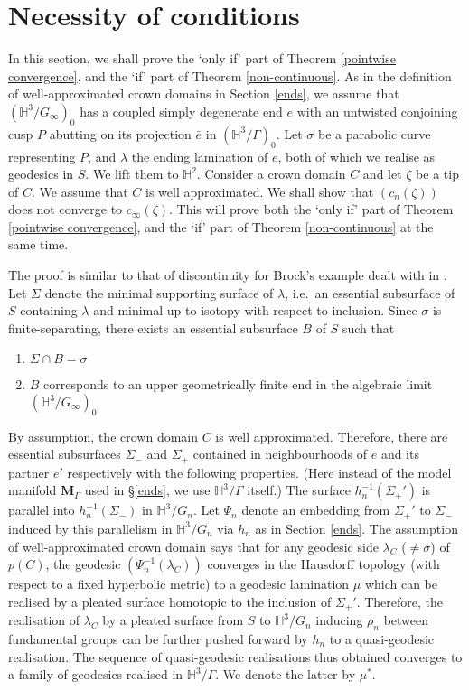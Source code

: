\documentclass{amsart}
\theoremstyle{definition}
\newcommand\HHH{{\mathbb H}}
\begin{document}
\section{Necessity of conditions}\label{necessity}
In this section, we shall prove  the \lq only if' part of Theorem \ref{pointwise convergence}, and  the \lq if' part of Theorem \ref{non-continuous}.
As in the  definition of well-approximated crown domains in Section \ref{ends}, we assume that $(\HHH^3/G_\infty)_0$ has  a coupled simply degenerate end $e$ with   an untwisted conjoining cusp $P$ abutting on its projection $\bar e$ in $(\HHH^3/\Gamma)_0$.
Let $\sigma$ be a parabolic curve representing $P$, and $\lambda$ the ending lamination of $e$, both of which we realise as geodesics in $S$.
We lift them to $\HHH^2$. Consider a crown domain $C$ and let $\zeta$ be a tip of $C$.
We assume that $C$ is well approximated.
We shall show that $(c_n(\zeta))$ does not converge to $c_\infty(\zeta)$. This will  prove  both the \lq only if' part of Theorem \ref{pointwise convergence}, and  the \lq if' part of Theorem \ref{non-continuous} at the same time.

The proof is similar to that of discontinuity for Brock's example   dealt with in \cite{mahan-series2}.
 Let $\Sigma$ denote the minimal supporting surface of $\lambda$, i.e.\ an essential subsurface of $S$ containing $\lambda$ and minimal up to isotopy with respect to  inclusion.
 Since $\sigma$ is finite-separating, there exists an essential subsurface $B$ of $S$ such that
 \begin{enumerate}
 	\item $\Sigma \cap B = \sigma$ 
 	\item $B$ corresponds to an upper  geometrically finite end in the algebraic limit $(\HHH^3/G_\infty)_0$
 \end{enumerate}
 By assumption, the crown domain $C$ is well approximated.
 Therefore, there are essential subsurfaces $\Sigma_-$ and $\Sigma_+$  contained in neighbourhoods of $e$ and its partner $e'$ respectively with the following properties.
(Here instead of the model manifold $\mathbf M_\Gamma$ used in \S \ref{ends}, we use $\HHH^3/\Gamma$ itself.)
The surface  $h_n^{-1}(\Sigma_+')$  is parallel into $h_n^{-1}(\Sigma_-)$ in $\HHH^3/G_n$. 
Let $\Psi_n$ denote  an embedding from $\Sigma_+'$ to $\Sigma_-$ induced by this parallelism in $\HHH^3/G_n$  via $h_n$ as in Section \ref{ends}.
The assumption of well-approximated crown domain says that for any geodesic side $\lambda_C$ ($\neq \sigma$) of $p(C)$, the geodesic $(\Psi_n^{-1}(\lambda_C))$ converges in the Hausdorff topology (with respect to a fixed hyperbolic metric) to a geodesic lamination $\mu$ which can be realised by a pleated surface homotopic to the inclusion of $\Sigma_+'$.
Therefore, the realisation of $\lambda_C$ by a pleated surface from $S$ to $\HHH^3/G_n$ inducing $\rho_n$ between  fundamental groups can be further pushed forward by $h_n$ to a quasi-geodesic realisation. The sequence of  quasi-geodesic realisations thus obtained converges to a family of geodesics realised in $\HHH^3/\Gamma$.  We denote the latter by $\mu^\ast$.
\end{document}
